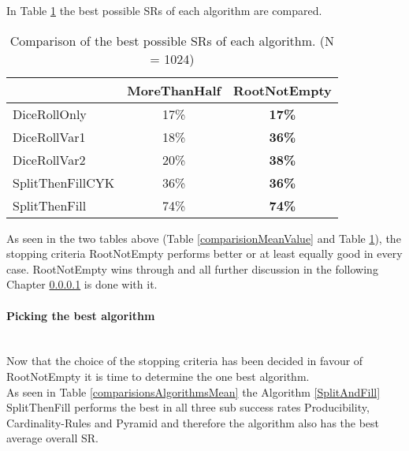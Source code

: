 \noindent In Table \ref{comparisionStoppingCriteria} the best possible SRs of each algorithm are compared.\\



\begin{table}[h]
	\centering
		\begin{tabular}{l|c|c|}
			\cline{2-3}
			& MoreThanHalf & RootNotEmpty \\ \hline
			\multicolumn{1}{|l|}{DiceRollOnly}  & 17\%             & \textbf{17\%}            \\ \hline
			\multicolumn{1}{|l|}{DiceRollVar1}  & 18\%             & \textbf{36\%}            \\ \hline
			\multicolumn{1}{|l|}{DiceRollVar2}  & 20\%             & \textbf{38\%}            \\ \hline
			\multicolumn{1}{|l|}{SplitThenFillCYK} & 36\%             & \textbf{36\%}            \\ \hline
			\multicolumn{1}{|l|}{SplitThenFill}  & 74\%             & \textbf{74\%}             \\ \hline
		\end{tabular}
	\caption{Comparison of the best possible SRs of each algorithm. (N = 1024)}
	\label{comparisionStoppingCriteria}
\end{table}
\noindent As seen in the two tables above (Table \ref{comparisionMeanValue} and Table \ref{comparisionStoppingCriteria}), the stopping criteria RootNotEmpty performs better or at least equally good in every case. RootNotEmpty wins through and all further discussion in the following Chapter \ref{comparisonOfTheAlgorithms} is done with it.
\clearpage
\paragraph{Picking the best algorithm}\label{comparisonOfTheAlgorithms}~\\
Now that the choice of the stopping criteria has been decided in favour of RootNotEmpty it is time to determine the one best algorithm.\\

\noindent As seen in Table \ref{comparisionsAlgorithmsMean} the Algorithm \ref{SplitAndFill} SplitThenFill performs the best in all three sub success rates Producibility, Cardinality-Rules and Pyramid and therefore the algorithm also has the best average overall SR.\\


